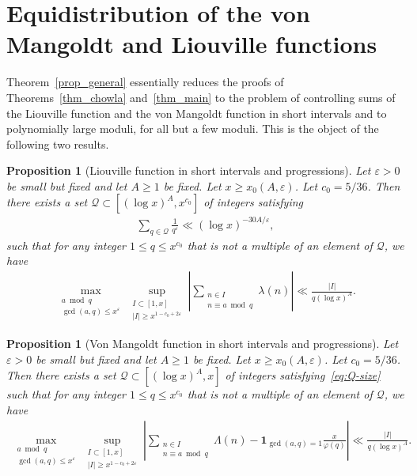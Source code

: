 \documentclass[11pt,letterpaper]{amsart}
\renewcommand{\leq}{\leqslant}
\renewcommand{\geq}{\geqslant}
\newtheorem{proposition}[theorem]{Proposition}
\theoremstyle{definition}
\numberwithin{equation}{section}
\newcommand{\ve}{\varepsilon}
\DeclareMathOperator{\n}{N}
\newcommand{\0}{\mathbf{0}}
\begin{document}
\section{Equidistribution of the von Mangoldt and Liouville functions}\label{sec:pntaps}

Theorem~\ref{prop_general} essentially reduces the proofs of Theorems~\ref{thm_chowla} and~\ref{thm_main} to the problem of controlling sums of the
Liouville  function and the von Mangoldt function in short intervals and to polynomially large moduli, for all but a few moduli. This is the object of the following two results.


\begin{proposition}[Liouville function in  short intervals and progressions]\label{prop_PNTAPs}
Let $\varepsilon>0$ be small but fixed and let $A\geq 1$ be fixed. Let $x\geq x_0(A,\varepsilon)$. Let $c_0=5/36$. Then there exists a set $\mathcal{Q}\subset [(\log x)^{A},x^{c_0}]$ of integers satisfying
    \begin{align}\label{eq:Q-size}
    \sum_{q\in \mathcal{Q}}\frac{1}{q^{\varepsilon}}\ll (\log x)^{-30A/\varepsilon},
    \end{align}
 such that for any integer $1\leq q\leq x^{c_0}$ that is not a multiple of an element of $\mathcal{Q}$, we  have
    \begin{align}\label{eqq3}
   \max_{\substack{a\bmod q\\\gcd(a,q)\leq x^{\varepsilon}}}\sup_{\substack{I\subset [1,x]\\|I|\geq x^{1-c_0+2\varepsilon}}} \left|\sum_{\substack{n\in I\\n\equiv a\bmod q}}\lambda(n)\right|\ll \frac{|I|}{q(\log x)^{A}}.    
    \end{align}
\end{proposition}


\begin{proposition}[Von Mangoldt function in short intervals and progressions]\label{prop_PNTAPs'}
Let $\varepsilon>0$ be small but fixed and let $A\geq 1$ be fixed. Let $x\geq x_0(A,\varepsilon)$. Let $c_0=5/36$. Then there exists a set $\mathcal{Q}\subset [(\log x)^{A},x]$ of integers satisfying~\eqref{eq:Q-size}
 such that for any integer $1\leq q\leq x^{c_0}$ that is not a multiple of an element of $\mathcal{Q}$, we  have
    \begin{align}\label{eqq3b}
   \max_{\substack{a\bmod q\\ \gcd(a,q)\leq x^\ve}}\sup_{\substack{I\subset [1,x]\\|I|\geq x^{1-c_0+2\varepsilon}}} \left|\sum_{\substack{n\in I\\n\equiv a\bmod q}}\Lambda(n)-\mathbf 1_{\gcd(a,q)=1}\frac{x}{\varphi(q)}\right|\ll \frac{|I|}{q(\log x)^{A}}.    
    \end{align}
\end{proposition}
\end{document}
